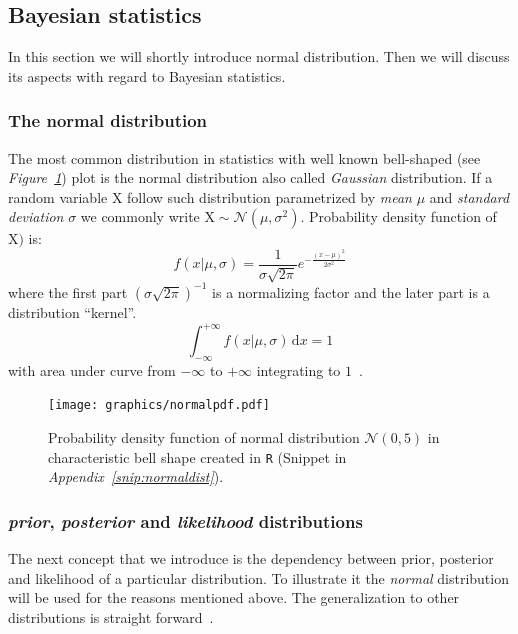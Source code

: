 \documentclass[12pt, a4paper, pdflatex, leqno]{report}
\begin{document}
\subsection{Bayesian statistics}
In this section we will shortly introduce normal distribution. Then we will discuss its aspects with regard to Bayesian statistics.

\subsubsection{The normal distribution}
The most common distribution in statistics with well known bell-shaped (see \emph{Figure~\ref{fig:normaldist}}) plot is the normal distribution also called \emph{Gaussian} distribution. If a random variable $\mathrm{X}$ follow such distribution parametrized by \emph{mean} $\mu$ and \emph{standard deviation} $\sigma$ we commonly write $\mathrm{X} \sim \mathcal{N}\left( \mu, \sigma^2 \right)$. Probability density function of $\mathrm{X})$ is:
$$
f \left(x | \mu, \sigma \right) = \frac{1}{\sigma \sqrt{2 \pi }} e^{- \frac{ {\left (  x - \mu \right )}^2 }{2 \sigma^2} }
$$
where the first part ${\left( \sigma \sqrt{2 \pi } \right)}^{-1}$ is a normalizing factor and the later part is a distribution ``kernel''.
$$
\int_{-\infty}^{+\infty} \! f \left(x | \mu, \sigma \right) \, \mathrm{d}x = 1
$$
with area under curve from $-\infty$ to $+\infty$ integrating to $1$~\citep{rice1995mathematical}.


\begin{figure}[htbp]
\centering
\texttt{[image: graphics/normalpdf.pdf]}
\begin{tiny}
\caption{Probability density function of normal distribution $\mathcal{N}\left( 0, 5 \right)$ in characteristic bell shape created in \texttt{R} (Snippet in \emph{Appendix~\ref{snip:normaldist}}).\label{fig:normaldist}}
\end{tiny}
\vspace{1cm}
\end{figure}



\subsubsection{\emph{prior}, \emph{posterior} and \emph{likelihood} distributions}
The next concept that we introduce is the dependency between prior, posterior and likelihood of a particular distribution. To illustrate it the \emph{normal} distribution will be used for the reasons mentioned above. The generalization to other distributions is straight forward~\citep{gelman2003bayesian}.\\
\end{document}
